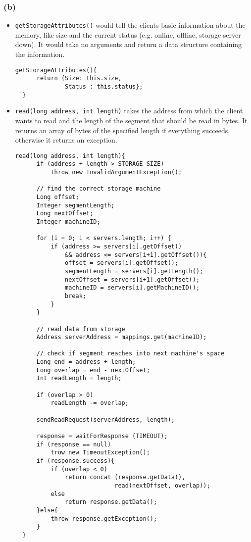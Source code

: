\documentclass[12pt,a4paper]{article}
\begin{document}
\subsubsection*{(b)}
\begin{itemize}
  \item \texttt{getStorageAttributes()} would tell the clients basic information about the memory, like size and the current status (e.g. online, offline, storage server down). It would take no arguments and return a data structure containing the information.
  
  \begin{lstlisting}[basicstyle=\footnotesize]
  getStorageAttributes(){
      return {Size: this.size,
              Status : this.status};
  }
  \end{lstlisting}
  \item \texttt{read(long address, int length)} takes the address from which the client wants to read and the length of the segment that should be read in bytes. It returns an array of bytes of the specified length if everything succeeds, otherwise it returns an exception.
  \begin{lstlisting}[basicstyle=\footnotesize]
  read(long address, int length){
      if (address + length > STORAGE_SIZE)
          throw new InvalidArgumentException();
  
      // find the correct storage machine
      Long offset;
      Integer segmentLength;
      Long nextOffset;
      Integer machineID;
      
      for (i = 0; i < servers.length; i++) {
          if (address >= servers[i].getOffset()
              && address <= servers[i+1].getOffset()){
              offset = servers[i].getOffset();
              segmentLength = servers[i].getLength();
              nextOffset = servers[i+1].getOffset();
              machineID = servers[i].getMachineID();
              break;
          }
      }
      
      // read data from storage
      Address serverAddress = mappings.get(machineID);
      
      // check if segment reaches into next machine's space
      Long end = address + length;
      Long overlap = end - nextOffset;
      Int readLength = length;
      
      if (overlap > 0)
          readLength -= overlap;
      
      sendReadRequest(serverAddress, length);
      
      response = waitForResponse (TIMEOUT);
      if (response == null)
          trow new TimeoutException();
      if (response.success){
          if (overlap < 0)
              return concat (response.getData(),
                            read(nextOffset, overlap));
          else
              return response.getData();
      }else{
          throw response.getException();
      }
  }
  \end{lstlisting}
  

\end{itemize}
\end{document}
